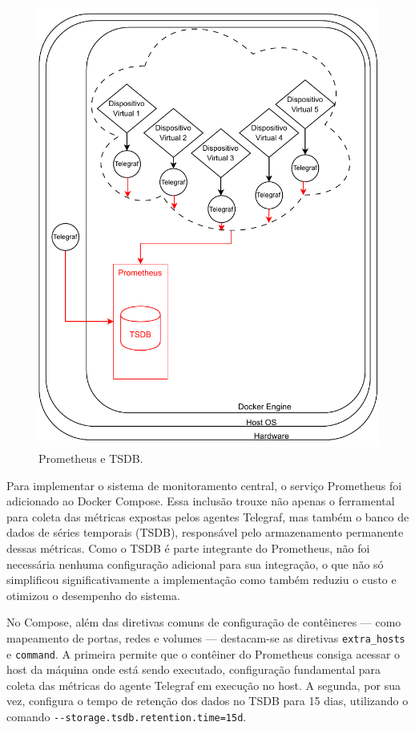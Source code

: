 \begin{figure}[H]
\centering
\includegraphics[scale=1]{Imagens/chap03/by-blocks/prometheus_diagram.pdf}
\caption{Prometheus e TSDB.}
\label{fig:DiagramaPrometheusTSDB}
\end{figure}

Para implementar o sistema de monitoramento central, o serviço Prometheus foi adicionado ao Docker Compose. Essa inclusão trouxe não apenas o ferramental para coleta das métricas expostas pelos agentes Telegraf, mas também o banco de dados de séries temporais (TSDB), responsável pelo armazenamento permanente dessas métricas. Como o TSDB é parte integrante do Prometheus, não foi necessária nenhuma configuração adicional para sua integração, o que não só simplificou significativamente a implementação como também reduziu o custo e otimizou o desempenho do sistema.

No Compose, além das diretivas comuns de configuração de contêineres --- como mapeamento de portas, redes e volumes --- destacam-se as diretivas \verb|extra_hosts| e \verb|command|. A primeira permite que o contêiner do Prometheus consiga acessar o host da máquina onde está sendo executado, configuração fundamental para coleta das métricas do agente Telegraf em execução no host. A segunda, por sua vez, configura o tempo de retenção dos dados no TSDB para 15 dias, utilizando o comando \verb|--storage.tsdb.retention.time=15d|.

